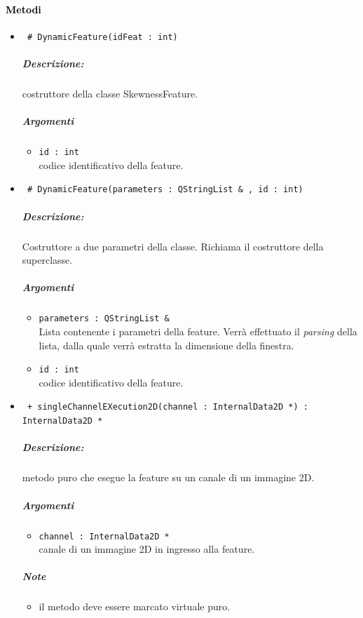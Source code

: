 \paragraph{\textcolor{black}{Metodi\\}}
	\begin{itemize}
	\item \color{blue}\verb! # DynamicFeature(idFeat : int)!
		\color{black}
		\subparagraph{Descrizione:} costruttore della classe SkewnessFeature.
		\subparagraph{Argomenti}
			\begin{itemize}
				\item \color{RoyalPurple} \verb!id : int! \\ 
				\color{black} codice identificativo della feature\g{}.	
			\end{itemize}
			
	\item \color{blue}\verb! # DynamicFeature(parameters : QStringList & , id : int)!
		\color{black}
		\subparagraph{Descrizione:} Costruttore a due parametri della classe. Richiama il costruttore della 						superclasse.
		\subparagraph{Argomenti}
			\begin{itemize}	
				\item \color{RoyalPurple} \verb!parameters : QStringList &! \\ 
				\color{black} Lista contenente i parametri della feature\g{}. Verrà effettuato il \textit{parsing} 						della lista, dalla quale verrà estratta la dimensione della finestra.
				\item \color{RoyalPurple} \verb!id : int! \\ 
				\color{black} codice identificativo della feature\g{}.	
			\end{itemize}

	\item \color{blue}\verb! + singleChannelEXecution2D(channel : InternalData2D *) : InternalData2D *!
		\color{black}
		\subparagraph{Descrizione:} metodo puro che esegue la feature su un canale di un immagine 2D.
		\subparagraph{Argomenti}
			\begin{itemize}
				\item \color{RoyalPurple} \verb!channel : InternalData2D * ! \\ 
				\color{black} canale di un immagine 2D in ingresso alla feature.		
			\end{itemize}
		\subparagraph{Note}
			\begin{itemize}
				\item il metodo deve essere marcato virtuale puro.
			\end{itemize}
			

\end{itemize}
